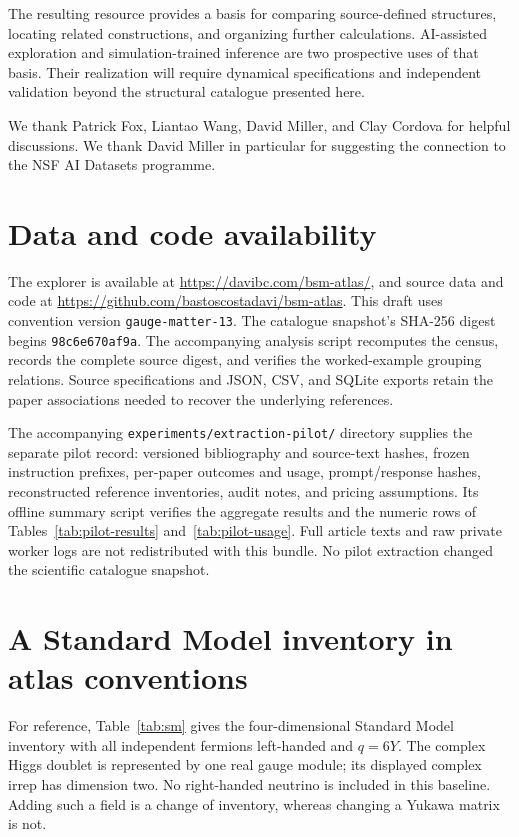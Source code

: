 The resulting resource provides a basis for comparing source-defined structures, locating related constructions, and organizing further calculations. AI-assisted exploration and simulation-trained inference are two prospective uses of that basis. Their realization will require dynamical specifications and independent validation beyond the structural catalogue presented here.

\acknowledgments

We thank Patrick Fox, Liantao Wang, David Miller, and Clay Cordova for helpful discussions. We thank David Miller in particular for suggesting the connection to the NSF AI Datasets programme.

\section{Data and code availability}
\label{sec:availability}
The explorer is available at \url{https://davibc.com/bsm-atlas/}, and source data and code at \url{https://github.com/bastoscostadavi/bsm-atlas}. This draft uses convention version \texttt{gauge-matter-13}. The catalogue snapshot's SHA-256 digest begins \texttt{98c6e670af9a}. The accompanying analysis script recomputes the census, records the complete source digest, and verifies the worked-example grouping relations. Source specifications and JSON, CSV, and SQLite exports retain the paper associations needed to recover the underlying references.

The accompanying \texttt{experiments/extraction-pilot/} directory supplies the separate pilot record: versioned bibliography and source-text hashes, frozen instruction prefixes, per-paper outcomes and usage, prompt/response hashes, reconstructed reference inventories, audit notes, and pricing assumptions. Its offline summary script verifies the aggregate results and the numeric rows of Tables~\ref{tab:pilot-results} and~\ref{tab:pilot-usage}. Full article texts and raw private worker logs are not redistributed with this bundle. No pilot extraction changed the scientific catalogue snapshot.

\appendix
\section{A Standard Model inventory in atlas conventions}
\label{app:sm}

For reference, Table~\ref{tab:sm} gives the four-dimensional Standard Model inventory with all independent fermions left-handed and $q=6Y$. The complex Higgs doublet is represented by one real gauge module; its displayed complex irrep has dimension two. No right-handed neutrino is included in this baseline. Adding such a field is a change of inventory, whereas changing a Yukawa matrix is not.

